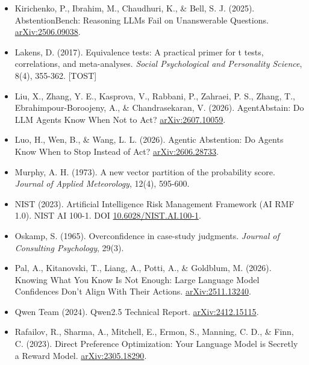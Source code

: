 \documentclass[10pt]{article}
\begin{document}
\begin{itemize}[leftmargin=1.6em,itemsep=3pt,label=\textbullet]
\item Kirichenko, P., Ibrahim, M., Chaudhuri, K., \& Bell, S. J. (2025). AbstentionBench: Reasoning LLMs Fail on Unanswerable Questions. \href{https://arxiv.org/abs/2506.09038}{arXiv:2506.09038}.

\item Lakens, D. (2017). Equivalence tests: A practical primer for t tests, correlations, and meta-analyses. \textit{Social Psychological and Personality Science}, 8(4), 355-362. [TOST]

\item Liu, X., Zhang, Y. E., Kasprova, V., Rabbani, P., Zahraei, P. S., Zhang, T., Ebrahimpour-Boroojeny, A., \& Chandrasekaran, V. (2026). AgentAbstain: Do LLM Agents Know When Not to Act? \href{https://arxiv.org/abs/2607.10059}{arXiv:2607.10059}.

\item Luo, H., Wen, B., \& Wang, L. L. (2026). Agentic Abstention: Do Agents Know When to Stop Instead of Act? \href{https://arxiv.org/abs/2606.28733}{arXiv:2606.28733}.

\item Murphy, A. H. (1973). A new vector partition of the probability score. \textit{Journal of Applied Meteorology}, 12(4), 595-600.

\item NIST (2023). Artificial Intelligence Risk Management Framework (AI RMF 1.0). NIST AI 100-1. DOI \href{https://doi.org/10.6028/NIST.AI.100-1}{10.6028/NIST.AI.100-1}.

\item Oskamp, S. (1965). Overconfidence in case-study judgments. \textit{Journal of Consulting Psychology}, 29(3).

\item Pal, A., Kitanovski, T., Liang, A., Potti, A., \& Goldblum, M. (2026). Knowing What You Know Is Not Enough: Large Language Model Confidences Don't Align With Their Actions. \href{https://arxiv.org/abs/2511.13240}{arXiv:2511.13240}.

\item Qwen Team (2024). Qwen2.5 Technical Report. \href{https://arxiv.org/abs/2412.15115}{arXiv:2412.15115}.

\item Rafailov, R., Sharma, A., Mitchell, E., Ermon, S., Manning, C. D., \& Finn, C. (2023). Direct Preference Optimization: Your Language Model is Secretly a Reward Model. \href{https://arxiv.org/abs/2305.18290}{arXiv:2305.18290}.


\end{itemize}
\end{document}
